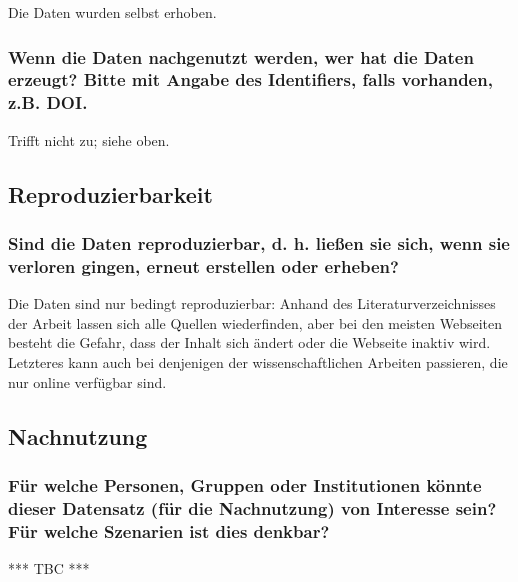 Die Daten wurden selbst erhoben.

\subsubsection{Wenn die Daten nachgenutzt werden, wer hat die Daten erzeugt? Bitte mit Angabe des Identifiers, falls vorhanden, z.B. DOI.}

Trifft nicht zu; siehe oben.

\subsection{Reproduzierbarkeit}

\subsubsection{Sind die Daten reproduzierbar, d. h. ließen sie sich, wenn sie verloren gingen, erneut erstellen oder erheben?}

Die Daten sind nur bedingt reproduzierbar:
Anhand des Literaturverzeichnisses der Arbeit lassen sich alle Quellen wiederfinden,
aber bei den meisten Webseiten besteht die Gefahr, dass der Inhalt sich ändert oder
die Webseite inaktiv wird. Letzteres kann auch bei denjenigen der wissenschaftlichen
Arbeiten passieren, die nur online verfügbar sind.

\subsection{Nachnutzung}

\subsubsection{Für welche Personen, Gruppen oder Institutionen könnte dieser Datensatz (für die Nachnutzung) von Interesse sein? Für welche Szenarien ist dies denkbar?}

*** TBC ***


